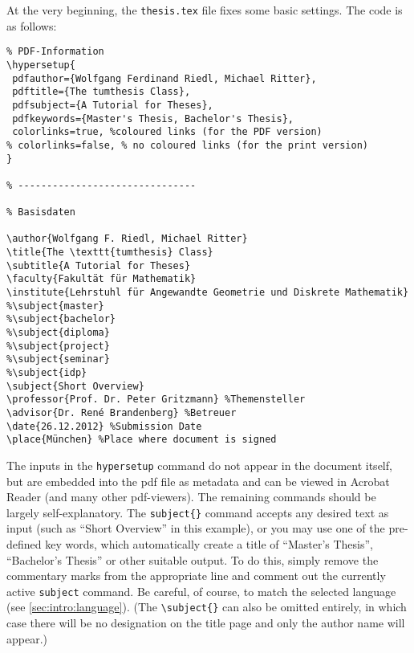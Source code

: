 At the very beginning, the \texttt{thesis.tex} file fixes some basic settings. The code is as follows:

\begin{lstlisting}[language={[LaTeX]TeX}]
% -------------------------------
% PDF-Information
\hypersetup{
 pdfauthor={Wolfgang Ferdinand Riedl, Michael Ritter},
 pdftitle={The tumthesis Class},
 pdfsubject={A Tutorial for Theses},
 pdfkeywords={Master's Thesis, Bachelor's Thesis},
 colorlinks=true, %coloured links (for the PDF version)
% colorlinks=false, % no coloured links (for the print version)
}

% -------------------------------

% Basisdaten 

\author{Wolfgang F. Riedl, Michael Ritter}
\title{The \texttt{tumthesis} Class}
\subtitle{A Tutorial for Theses}
\faculty{Fakultät für Mathematik}
\institute{Lehrstuhl für Angewandte Geometrie und Diskrete Mathematik}
%\subject{master}
%\subject{bachelor}
%\subject{diploma}
%\subject{project}
%\subject{seminar}
%\subject{idp}
\subject{Short Overview}
\professor{Prof. Dr. Peter Gritzmann} %Themensteller
\advisor{Dr. René Brandenberg} %Betreuer
\date{26.12.2012} %Submission Date
\place{München} %Place where document is signed
\end{lstlisting}

The inputs in the \verb|hypersetup| command do not appear in the document itself, but are embedded into the pdf file as metadata and can be viewed in Acrobat Reader (and many other pdf-viewers). The remaining commands should be largely self-explanatory. The \verb|subject{}| command accepts any desired text as input (such as \enquote{Short Overview} in this example), or you may use one of the pre-defined key words, which automatically create a title of \enquote{Master's Thesis}, \enquote{Bachelor's Thesis} or other suitable output. To do this, simply remove the commentary marks from the appropriate line and comment out the currently active \verb|subject| command. Be careful, of course, to match the selected language (see \cref{sec:intro:language}). (The \verb|\subject{}| can also be omitted entirely, in which case there will be no designation on the title page and only the author name will appear.)


